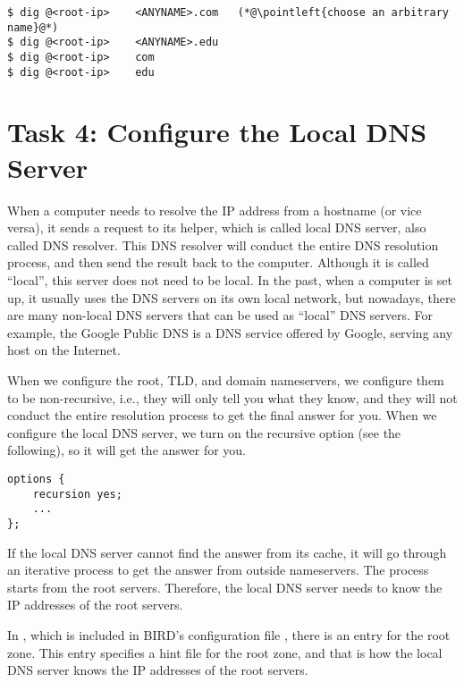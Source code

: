 \begin{lstlisting}
$ dig @<root-ip>    <ANYNAME>.com   (*@\pointleft{choose an arbitrary name}@*) 
$ dig @<root-ip>    <ANYNAME>.edu
$ dig @<root-ip>    com
$ dig @<root-ip>    edu
\end{lstlisting}


\section{Task 4: Configure the Local DNS Server} 


When a computer needs to resolve the IP address from a hostname (or vice versa),
it sends a request to its helper, which is called local DNS server, also
called DNS resolver. This DNS resolver will conduct the
entire DNS resolution process, and then send the result back to the computer.
Although it is called ``local'', this server does not need to be local.
In the past, when a computer is set up, it usually uses the DNS servers on its own
local network, but nowadays, there are many non-local DNS servers that can be used as
``local'' DNS servers. For example, the Google Public DNS
is a DNS service offered by Google, serving any host on the Internet.


When we configure the root, TLD, and domain nameservers, we configure them
to be non-recursive, i.e., they will only tell you what they know, and they
will not conduct the entire resolution process to get the final answer for you. 
When we configure the local DNS server, we turn on the recursive option (see
the following), so it will get the answer for you. 

\begin{lstlisting}
options {
    recursion yes;
    ...
};
\end{lstlisting}
 

If the local DNS server cannot find the answer from its cache, it
will go through an iterative process to get the answer from outside
nameservers.  The process starts from the root servers.
Therefore, the local DNS server needs to
know the IP addresses of the root servers.


In , which is included
in BIRD's configuration file , there is an
entry for the root zone. This entry specifies a hint file for the
root zone, and that is how the local DNS server knows the IP addresses of the
root servers.

